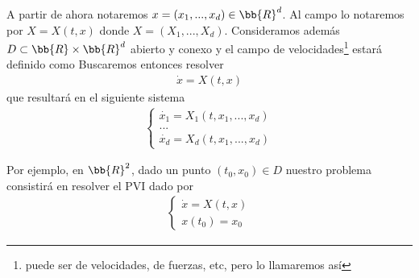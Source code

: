\begin{notacion}
    A partir de ahora notaremos $x = (x_1,...,x_d)\in \bb{R}^d$. Al campo lo notaremos por $X = X(t,x)$ donde $X=(X_1,...,X_d)$. Consideramos además $D\subset \bb{R}\times \bb{R}^d$ abierto y conexo y el campo de velocidades\footnote{puede ser de velocidades, de fuerzas, etc, pero lo llamaremos así} estará definido como
    Buscaremos entonces resolver
    \begin{gather*}
        \dot{x} = X(t,x)
    \end{gather*}
    que resultará en el siguiente sistema
    \begin{gather*}
        \left\{
            \begin{array}{l}
                \dot{x_1} = X_1(t,x_1,...,x_d)\\
                ...\\
                \dot{x_d} = X_d(t,x_1, ... ,x_d)
            \end{array}
        \right.
    \end{gather*}

    Por ejemplo, en $\bb{R}^2$, dado un punto $(t_0,x_0)\in D$ nuestro problema consistirá en resolver el PVI dado por 
    \begin{gather*}
        \left\{
            \begin{array}{l}
                \dot{x} = X(t,x)\\
                x(t_0) = x_0
            \end{array}
        \right.
    \end{gather*}
\end{notacion}

\begin{teo}
    
\end{teo}


